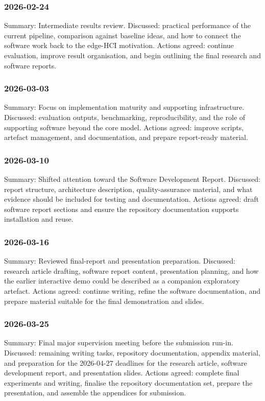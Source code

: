 ﻿\documentclass[11pt,a4paper]{article}
\begin{document}
\subsubsection*{2026-02-24}

Summary: Intermediate results review.
Discussed: practical performance of the current pipeline, comparison against
baseline ideas, and how to connect the software work back to the edge-HCI
motivation.
Actions agreed: continue evaluation, improve result organisation, and begin
outlining the final research and software reports.

\subsubsection*{2026-03-03}

Summary: Focus on implementation maturity and supporting infrastructure.
Discussed: evaluation outputs, benchmarking, reproducibility, and the role of
supporting software beyond the core model.
Actions agreed: improve scripts, artefact management, and documentation, and
prepare report-ready material.

\subsubsection*{2026-03-10}

Summary: Shifted attention toward the Software Development Report.
Discussed: report structure, architecture description, quality-assurance
material, and what evidence should be included for testing and documentation.
Actions agreed: draft software report sections and ensure the repository
documentation supports installation and reuse.

\subsubsection*{2026-03-16}

Summary: Reviewed final-report and presentation preparation.
Discussed: research article drafting, software report content, presentation
planning, and how the earlier interactive demo could be described as a
companion exploratory artefact.
Actions agreed: continue writing, refine the software documentation, and
prepare material suitable for the final demonstration and slides.

\subsubsection*{2026-03-25}

Summary: Final major supervision meeting before the submission run-in.
Discussed: remaining writing tasks, repository documentation, appendix
material, and preparation for the 2026-04-27 deadlines for the research
article, software development report, and presentation slides.
Actions agreed: complete final experiments and writing, finalise the repository
documentation set, prepare the presentation, and assemble the appendices for
submission.
\end{document}
